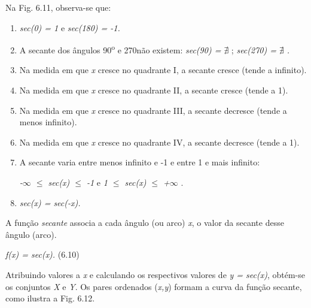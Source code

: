 Na Fig. 6.11, observa-se que:

\begin{caixa}
\begin{enumerate}
    \item \textit{sec(0\degree) = 1}   e  \textit{sec(180\degree) = -1.}

    \item A secante dos ângulos 90\textsuperscript{o} e 270\degree não existem: \textit{sec(90\degree) =  \(  \nexists  \) };  \textit{sec(270\degree) =  \(  \nexists  \) .}

    \item Na medida em que \textit{x} cresce no quadrante I, a secante cresce (tende a infinito).

    \item Na medida em que \textit{x} cresce no quadrante II, a secante cresce (tende a 1).

    \item Na medida em que \textit{x} cresce no quadrante III, a secante decresce (tende a menos infinito).

    \item Na medida em que \textit{x} cresce no quadrante IV, a secante decresce (tende a 1).

    \item A secante varia entre menos infinito e -1 e entre 1 e mais infinito: 

 \textit{-$\infty $ $ \leq $  sec(x) $ \leq $  -1  }e\textit{   1 $ \leq $  sec(x) $ \leq $  +$\infty $   }.

    \item \textit{ sec(x) = sec(-x).}
\end{enumerate}
\end{caixa}

\begin{caixa}
A função \textit{secante} associa a cada ângulo (ou arco) \textit{x}, o valor da secante desse ângulo (arco).

\textit{f(x) = sec(x).} \tab (6.10)
\end{caixa}

Atribuindo valores a \textit{x} e calculando os respectivos valores de \textit{y = sec(x)}, obtém-se os conjuntos \textit{X }e\textit{ Y}. Os pares ordenados (\textit{x,y}) formam a curva da função secante, como ilustra a Fig. 6.12.

